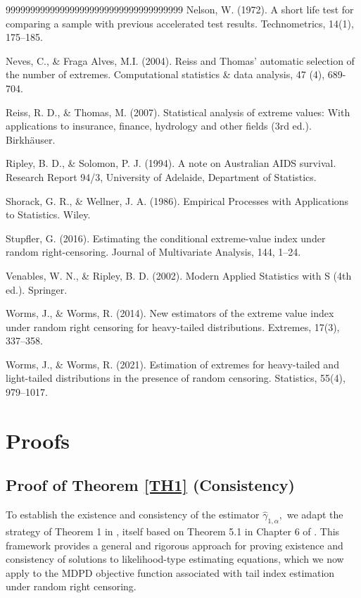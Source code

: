 \documentclass[reqno,openbib,runningheads,a4paper,12pt]{amsart}%
\begin{document}
\begin{thebibliography}{999999999999999999999999999999999999}
Nelson, W. (1972). A short life test for
comparing a sample with previous accelerated test results. Technometrics,
14(1), 175--185.

Neves, C., \& Fraga Alves,
M.I. (2004). Reiss and Thomas' automatic selection of the number of extremes.
Computational statistics \& data analysis, 47 (4), 689-704.

Reiss, R. D., \& Thomas, M. (2007).
Statistical analysis of extreme values: With applications to insurance,
finance, hydrology and other fields (3rd ed.). Birkh\"{a}user.

Ripley, B. D., \& Solomon, P. J.
(1994). A note on Australian AIDS survival. Research Report 94/3, University
of Adelaide, Department of Statistics.

Shorack, G. R., \& Wellner, J. A.
(1986). Empirical Processes with Applications to Statistics. Wiley.

Stupfler, G. (2016). Estimating the conditional
extreme-value index under random right-censoring. Journal of Multivariate
Analysis, 144, 1--24.

Venables, W. N., \& Ripley, B. D.
(2002). Modern Applied Statistics with S (4th ed.). Springer.

Worms, J., \& Worms, R. (2014). New
estimators of the extreme value index under random right censoring for
heavy-tailed distributions. Extremes, 17(3), 337--358.

Worms, J., \& Worms, R. (2021).
Estimation of extremes for heavy-tailed and light-tailed distributions in the
presence of random censoring. Statistics, 55(4), 979--1017.
\end{thebibliography}

\section{\textbf{Proofs\label{sec6}}}

\subsection{Proof of Theorem \ref{TH1} (Consistency)}

To establish the existence and consistency of the estimator $\widehat{\gamma
}_{1,\alpha},$ we adapt the strategy of Theorem 1 in \cite{DGG13}, itself
based on Theorem 5.1 in Chapter 6 of \cite{LC98}. This framework provides a
general and rigorous approach for proving existence and consistency of
solutions to likelihood-type estimating equations, which we now apply to the
MDPD objective function associated with tail index estimation under random
right censoring.\smallskip
\end{document}
